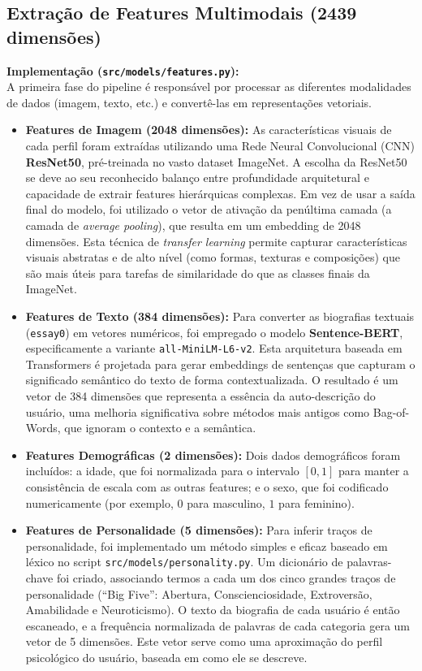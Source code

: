 \subsection{Extração de Features Multimodais (2439 dimensões)}
\textbf{Implementação (\texttt{src/models/features.py}):} \\
A primeira fase do pipeline é responsável por processar as diferentes modalidades de dados (imagem, texto, etc.) e convertê-las em representações vetoriais.

\begin{itemize}
    \item \textbf{Features de Imagem (2048 dimensões):} As características visuais de cada perfil foram extraídas utilizando uma Rede Neural Convolucional (CNN) \textbf{ResNet50}, pré-treinada no vasto dataset ImageNet. A escolha da ResNet50 se deve ao seu reconhecido balanço entre profundidade arquitetural e capacidade de extrair features hierárquicas complexas. Em vez de usar a saída final do modelo, foi utilizado o vetor de ativação da penúltima camada (a camada de \textit{average pooling}), que resulta em um embedding de 2048 dimensões. Esta técnica de \textit{transfer learning} permite capturar características visuais abstratas e de alto nível (como formas, texturas e composições) que são mais úteis para tarefas de similaridade do que as classes finais da ImageNet.

    \item \textbf{Features de Texto (384 dimensões):} Para converter as biografias textuais (\texttt{essay0}) em vetores numéricos, foi empregado o modelo \textbf{Sentence-BERT}, especificamente a variante \texttt{all-MiniLM-L6-v2}. Esta arquitetura baseada em Transformers é projetada para gerar embeddings de sentenças que capturam o significado semântico do texto de forma contextualizada. O resultado é um vetor de 384 dimensões que representa a essência da auto-descrição do usuário, uma melhoria significativa sobre métodos mais antigos como Bag-of-Words, que ignoram o contexto e a semântica.

    \item \textbf{Features Demográficas (2 dimensões):} Dois dados demográficos foram incluídos: a idade, que foi normalizada para o intervalo $[0,1]$ para manter a consistência de escala com as outras features; e o sexo, que foi codificado numericamente (por exemplo, $0$ para masculino, $1$ para feminino).

    \item \textbf{Features de Personalidade (5 dimensões):} Para inferir traços de personalidade, foi implementado um método simples e eficaz baseado em léxico no script \texttt{src/models/personality.py}. Um dicionário de palavras-chave foi criado, associando termos a cada um dos cinco grandes traços de personalidade (``Big Five'': Abertura, Conscienciosidade, Extroversão, Amabilidade e Neuroticismo). O texto da biografia de cada usuário é então escaneado, e a frequência normalizada de palavras de cada categoria gera um vetor de 5 dimensões. Este vetor serve como uma aproximação do perfil psicológico do usuário, baseada em como ele se descreve.
\end{itemize}

